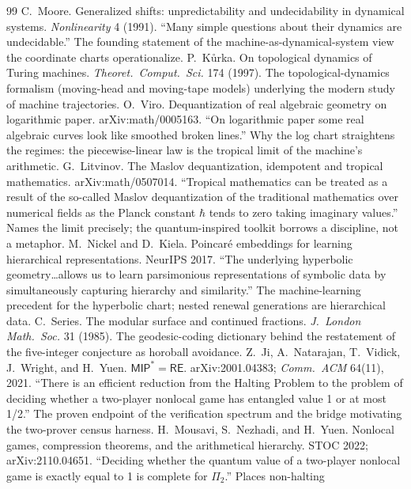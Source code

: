 \documentclass[11pt]{article}
\begin{document}
\begin{thebibliography}{99}
 C.~Moore. Generalized shifts: unpredictability and
undecidability in dynamical systems. \emph{Nonlinearity} 4 (1991).
``Many simple questions about their dynamics are undecidable.''
The founding statement of the machine-as-dynamical-system view the
coordinate charts operationalize.
 P.~K\r{u}rka. On topological dynamics of Turing
machines. \emph{Theoret.\ Comput.\ Sci.} 174 (1997).
The topological-dynamics formalism (moving-head and moving-tape
models) underlying the modern study of machine trajectories.
 O.~Viro. Dequantization of real algebraic geometry on
logarithmic paper. arXiv:math/0005163.
``On logarithmic paper some real algebraic curves look like smoothed
broken lines.'' Why the log chart straightens the regimes: the
piecewise-linear law is the tropical limit of the machine's
arithmetic.
 G.~Litvinov. The Maslov dequantization, idempotent
and tropical mathematics. arXiv:math/0507014.
``Tropical mathematics can be treated as a result of the so-called
Maslov dequantization of the traditional mathematics over numerical
fields as the Planck constant $\hbar$ tends to zero taking imaginary
values.'' Names the limit precisely; the quantum-inspired toolkit
borrows a discipline, not a metaphor.
 M.~Nickel and D.~Kiela. Poincar\'e embeddings
for learning hierarchical representations. NeurIPS 2017.
``The underlying hyperbolic geometry\ldots allows us to learn
parsimonious representations of symbolic data by simultaneously
capturing hierarchy and similarity.'' The machine-learning precedent
for the hyperbolic chart; nested renewal generations are
hierarchical data.
 C.~Series. The modular surface and continued
fractions. \emph{J.\ London Math.\ Soc.} 31 (1985).
The geodesic-coding dictionary behind the restatement of the
five-integer conjecture as horoball avoidance.
 Z.~Ji, A.~Natarajan, T.~Vidick, J.~Wright, and
H.~Yuen. $\mathsf{MIP}^{*} = \mathsf{RE}$. arXiv:2001.04383;
\emph{Comm.\ ACM} 64(11), 2021.
``There is an efficient reduction from the Halting Problem to the
problem of deciding whether a two-player nonlocal game has entangled
value 1 or at most 1/2.'' The proven endpoint of the verification
spectrum and the bridge motivating the two-prover census harness.
 H.~Mousavi, S.~Nezhadi, and H.~Yuen. Nonlocal games,
compression theorems, and the arithmetical hierarchy. STOC 2022;
arXiv:2110.04651.
``Deciding whether the quantum value of a two-player nonlocal game
is exactly equal to 1 is complete for $\Pi_2$.'' Places non-halting

\end{thebibliography}
\end{document}
